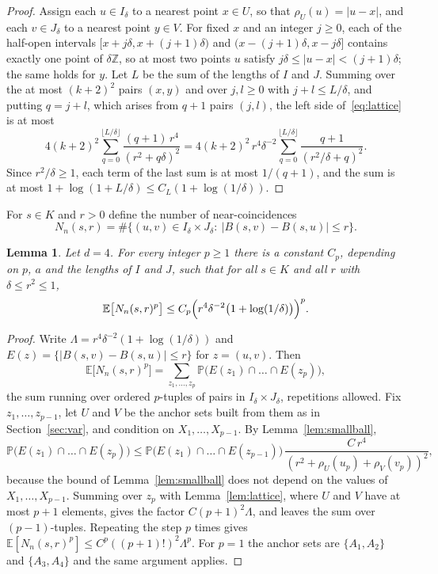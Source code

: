 \documentclass[11pt]{amsart}
\newtheorem{lemma}[theorem]{Lemma}
\theoremstyle{remark}
\newcommand{\Z}{\mathbb{Z}}
\newcommand{\PP}{\mathbb{P}}
\newcommand{\E}{\mathbb{E}}
\begin{document}
\begin{proof}
Assign each $u\in I_\delta$ to a nearest point $x\in U$, so that $\rho_U(u)=|u-x|$, and each $v\in J_\delta$ to a
nearest point $y\in V$. For fixed $x$ and an integer $j\ge0$, each of the half-open intervals $[x+j\delta,x+(j+1)\delta)$
and $(x-(j+1)\delta,x-j\delta]$ contains exactly one point of $\delta\Z$, so at most two points $u$ satisfy
$j\delta\le|u-x|<(j+1)\delta$; the same holds for $y$. Let $L$ be the sum of the lengths of $I$ and $J$. Summing over
the at most $(k+2)^2$ pairs $(x,y)$ and over $j,l\ge0$ with $j+l\le L/\delta$, and putting $q=j+l$, which arises from
$q+1$ pairs $(j,l)$, the left side of~\eqref{eq:lattice} is at most
\[
4(k+2)^2\sum_{q=0}^{\lfloor L/\delta\rfloor}\frac{(q+1)\,r^4}{(r^2+q\delta)^2}
=4(k+2)^2\,r^4\delta^{-2}\sum_{q=0}^{\lfloor L/\delta\rfloor}\frac{q+1}{(r^2/\delta+q)^2}.
\]
Since $r^2/\delta\ge1$, each term of the last sum is at most $1/(q+1)$, and the sum is at most
$1+\log(1+L/\delta)\le C_L(1+\log(1/\delta))$.
\end{proof}

For $s\in K$ and $r>0$ define the number of near-coincidences
\[
N_n(s,r)=\#\bigl\{(u,v)\in I_\delta\times J_\delta:\ |B(s,v)-B(s,u)|\le r\bigr\}.
\]

\begin{lemma}\label{lem:moments}
Let $d=4$. For every integer $p\ge1$ there is a constant $C_p$, depending on $p$, $a$ and the lengths of $I$ and $J$,
such that for all $s\in K$ and all $r$ with $\delta\le r^2\le1$,
\begin{equation}\label{eq:moments}
\E\bigl[N_n(s,r)^p\bigr]\le C_p\Bigl(r^4\delta^{-2}\bigl(1+\log(1/\delta)\bigr)\Bigr)^p.
\end{equation}
\end{lemma}

\begin{proof}
Write $\Lambda=r^4\delta^{-2}(1+\log(1/\delta))$ and $E(z)=\{|B(s,v)-B(s,u)|\le r\}$ for $z=(u,v)$. Then
\[
\E\bigl[N_n(s,r)^p\bigr]=\sum_{z_1,\dots,z_p}\PP\bigl(E(z_1)\cap\dots\cap E(z_p)\bigr),
\]
the sum running over ordered $p$-tuples of pairs in $I_\delta\times J_\delta$, repetitions allowed. Fix
$z_1,\dots,z_{p-1}$, let $U$ and $V$ be the anchor sets built from them as in Section~\ref{sec:var}, and condition on
$X_1,\dots,X_{p-1}$. By Lemma~\ref{lem:smallball},
\[
\PP\bigl(E(z_1)\cap\dots\cap E(z_p)\bigr)\le\PP\bigl(E(z_1)\cap\dots\cap E(z_{p-1})\bigr)\,
\frac{C\,r^4}{(r^2+\rho_U(u_p)+\rho_V(v_p))^2},
\]
because the bound of Lemma~\ref{lem:smallball} does not depend on the values of $X_1,\dots,X_{p-1}$. Summing over $z_p$
with Lemma~\ref{lem:lattice}, where $U$ and $V$ have at most $p+1$ elements, gives the factor $C(p+1)^2\Lambda$, and
leaves the sum over $(p-1)$-tuples. Repeating the step $p$ times gives $\E[N_n(s,r)^p]\le C^p((p+1)!)^2\Lambda^p$. For
$p=1$ the anchor sets are $\{A_1,A_2\}$ and $\{A_3,A_4\}$ and the same argument applies.
\end{proof}
\end{document}
